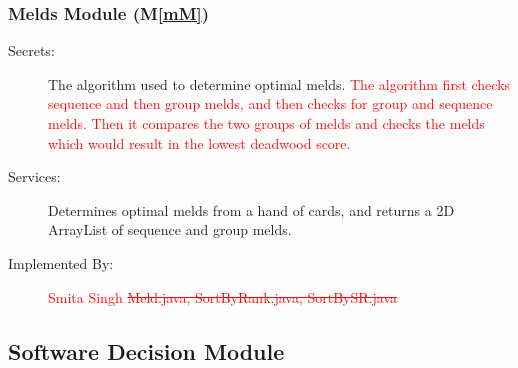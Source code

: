 \documentclass[12pt, titlepage]{article}
\newcommand{\mref}[1]{M\ref{#1}}
\begin{document}
\subsubsection{Melds Module (\mref{mM})}
\begin{description}
    \item[Secrets:]The algorithm used to determine optimal melds. \textcolor{red}{The algorithm first checks sequence and then group melds, and then checks for group and sequence melds. Then it compares the two groups of melds and checks the melds which would result in the lowest deadwood score.}
    \item[Services:]Determines optimal melds from a hand of cards, and returns a 2D ArrayList of sequence and group melds. 
    \item[Implemented By:]\textcolor{red}{Smita Singh \sout{Meld.java, SortByRank.java, SortBySR.java}}
\end{description}
\subsection{Software Decision Module}
\end{document}
